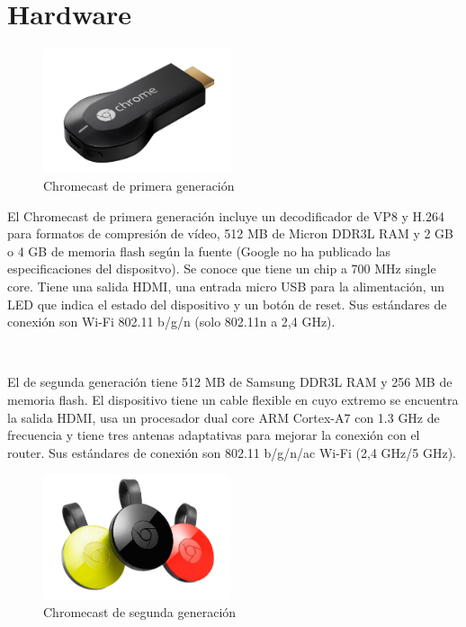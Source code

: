 \section{Hardware}

\begin{figure}[h]
	\centering
	\includegraphics[width=0.49\textwidth]{./Imagenes/chromecast1gen.jpg}
	\caption{Chromecast de primera generación}\label{fig:1gen}
\end{figure}

El Chromecast de primera generación incluye un decodificador de VP8 y H.264 para formatos de compresión de vídeo, 512 MB de Micron DDR3L RAM y 2 GB o 4 GB de memoria flash según la fuente (Google no ha publicado las especificaciones del dispositvo).
Se conoce que tiene un chip a 700 MHz single core.
Tiene una salida HDMI, una entrada micro USB para la alimentación, un LED que indica el estado del dispositivo y un botón de reset.
Sus estándares de conexión son Wi-Fi 802.11 b/g/n (solo 802.11n a 2,4 GHz).

\

El de segunda generación tiene 512 MB de Samsung DDR3L RAM y 256 MB de memoria flash.
El dispositivo tiene un cable flexible en cuyo extremo se encuentra la salida HDMI, usa un procesador dual core ARM Cortex-A7 con 1.3 GHz de frecuencia y tiene tres antenas adaptativas para mejorar la conexión con el router.
Sus estándares de conexión son 802.11 b/g/n/ac Wi-Fi (2,4 GHz/5 GHz).

\begin{figure}[h]
	\centering
	\includegraphics[width=0.49\textwidth]{./Imagenes/chromecast2gen.jpg}
	\caption{Chromecast de segunda generación}\label{fig:2gen}
\end{figure}

